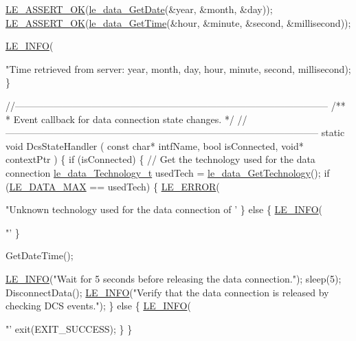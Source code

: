 \begin{DoxyCodeInclude}
{{{{    \hyperlink{le__log_8h_a7cd2daa3d4af1de4d29e0eed95187484}{LE\_ASSERT\_OK}(\hyperlink{le__data__interface_8h_a02a43ab1a3b9aef7e170214ffeb48907}{le\_data\_GetDate}(&year, &month, &day));
    \hyperlink{le__log_8h_a7cd2daa3d4af1de4d29e0eed95187484}{LE\_ASSERT\_OK}(\hyperlink{le__data__interface_8h_afdd17e6659e60b1510fe54c23a022960}{le\_data\_GetTime}(&hour, &minute, &second, &millisecond));

    \hyperlink{le__log_8h_a23e6d206faa64f612045d688cdde5808}{LE\_INFO}(\textcolor{stringliteral}{"Time retrieved from server: %
            year, month, day, hour, minute, second, millisecond);
\}

\textcolor{comment}{//--------------------------------------------------------------------------------------------------}\textcolor{comment}{}
\textcolor{comment}{/**}
\textcolor{comment}{ *  Event callback for data connection state changes.}
\textcolor{comment}{ */}
\textcolor{comment}{//--------------------------------------------------------------------------------------------------}
\textcolor{keyword}{static} \textcolor{keywordtype}{void} DcsStateHandler
(
    \textcolor{keyword}{const} \textcolor{keywordtype}{char}* intfName,
    \textcolor{keywordtype}{bool} isConnected,
    \textcolor{keywordtype}{void}* contextPtr
)
\{
    \textcolor{keywordflow}{if} (isConnected)
    \{
        \textcolor{comment}{// Get the technology used for the data connection}
        \hyperlink{le__data__interface_8h_a245d12b4d3367d81c0fc8b76fa60674a}{le\_data\_Technology\_t} usedTech = 
      \hyperlink{le__data__interface_8h_a76b66fd017a52db01fcc46a5fcd2f54b}{le\_data\_GetTechnology}();
        \textcolor{keywordflow}{if} (\hyperlink{le__data__interface_8h_a245d12b4d3367d81c0fc8b76fa60674aa5143acc7e16842ac4cf33afa34b50c0b}{LE\_DATA\_MAX} == usedTech)
        \{
            \hyperlink{le__log_8h_a353590f91b3143a7ba3a416ae5a50c3d}{LE\_ERROR}(\textcolor{stringliteral}{"Unknown technology used for the data connection of '%
        \}
        \textcolor{keywordflow}{else}
        \{
            \hyperlink{le__log_8h_a23e6d206faa64f612045d688cdde5808}{LE\_INFO}(\textcolor{stringliteral}{"'%
        \}

        GetDateTime();

        \hyperlink{le__log_8h_a23e6d206faa64f612045d688cdde5808}{LE\_INFO}(\textcolor{stringliteral}{"Wait for 5 seconds before releasing the data connection."});
        sleep(5);
        DisconnectData();
        \hyperlink{le__log_8h_a23e6d206faa64f612045d688cdde5808}{LE\_INFO}(\textcolor{stringliteral}{"Verify that the data connection is released by checking DCS events."});
    \}
    \textcolor{keywordflow}{else}
    \{
        \hyperlink{le__log_8h_a23e6d206faa64f612045d688cdde5808}{LE\_INFO}(\textcolor{stringliteral}{"'%
        exit(EXIT\_SUCCESS);
    \}
\}

}}}}}}}}
\end{DoxyCodeInclude}
